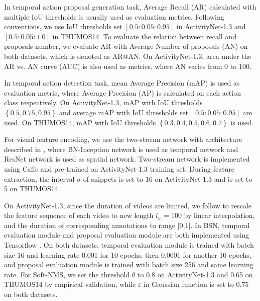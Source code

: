 \documentclass[runningheads]{llncs}
\begin{document}
In temporal action proposal generation task, Average Recall (AR) calculated with multiple IoU thresholds is usually used as evaluation metrics. Following  conventions, we use IoU thresholds set $[0.5:0.05:0.95]$ in ActivityNet-1.3 and $[0.5:0.05:1.0]$ in THUMOS14. 
To evaluate the relation between recall and proposals number,  we evaluate AR with Average Number of proposals (AN) on both datasets, which is denoted as  AR@AN. 
On ActivityNet-1.3, area under the AR vs. AN curve (AUC) is also used as metrics, where AN varies from 0 to 100.

In temporal action detection task, mean Average Precision (mAP) is used as evaluation metric, where Average Precision (AP) is calculated on each action class respectively. On ActivityNet-1.3, mAP with IoU thresholds $\left \{0.5,0.75,0.95\right \}$ and average mAP with IoU thresholds set $[0.5:0.05:0.95]$ are used. On THUMOS14, mAP with IoU thresholds $\left \{0.3,0.4,0.5,0.6,0.7 \right \}$ is used.



For visual feature encoding, we use the two-stream network \cite{simonyan2014two} with architecture described in \cite{xiong2016cuhk}, where BN-Inception network \cite{ioffe2015batch} is used as temporal network and ResNet network \cite{he2016deep} is used as spatial network. Two-stream network is implemented  using Caffe \cite{jia2014caffe} and pre-trained on ActivityNet-1.3 training set. During feature extraction,  the interval $\sigma $ of snippets is set to 16 on ActivityNet-1.3 and is set to 5 on THUMOS14.

On ActivityNet-1.3, since the duration of videos are limited, we follow \cite{lin2017temporal} to rescale the feature sequence of each video to new length $l_w =100$ by linear interpolation, and the duration of corresponding annotations to range [0,1].
In BSN, temporal evaluation module and proposal evaluation module are both implemented using Tensorflow \cite{abadi2016tensorflow}. On both datasets, temporal evaluation module is trained with batch size 16 and learning rate 0.001 for 10 epochs, then 0.0001 for another 10 epochs, and proposal evaluation module is trained with batch size 256 and same learning rate. %
For Soft-NMS, we set the threshold $\theta$ to 0.8 on ActivityNet-1.3 and 0.65 on THUMOS14 by empirical validation, while $\varepsilon $ in Gaussian function is set to 0.75 on both datasets.
\end{document}
